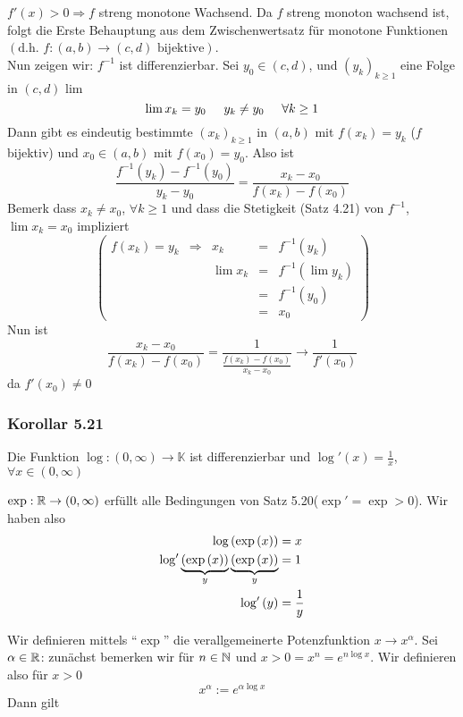 \begin{beweis}{}
$f'(x)>0\Rightarrow f$ streng monotone Wachsend. Da $f$ streng monoton wachsend ist, folgt die Erste Behauptung aus dem Zwischenwertsatz für monotone Funktionen $\left( \text{d.h. }f:\left( a,b\right)\to\left( c,d\right)\text{ bijektive}\right)$.\\

Nun zeigen wir: $f^{-1}$ ist differenzierbar. Sei $y_0\in\left( c,d\right)$, und $\left( y_k\right)_{k\geq 1}$ eine Folge in $\left( c,d\right)$ lim
\[\lim x_k=y_0\hspace{5mm}y_k\not=y_0\hspace{5mm}\forall k\geq 1\] 
Dann gibt es eindeutig bestimmte $\left( x_k\right)_{k\geq 1}$ in $\left( a,b\right)$ mit $f\left( x_k\right)=y_k$ ($f$ bijektiv) und $x_0\in\left( a,b\right)$ mit $f\left( x_0\right)=y_0$. Also ist
\[\frac{{{f^{ - 1}}\left( {{y_k}} \right) - {f^{ - 1}}\left( {{y_0}} \right)}}{{{y_k} - {y_0}}} = \frac{{{x_k} - {x_0}}}{{f\left( {{x_k}} \right) - f\left( {{x_0}} \right)}}\]
Bemerk dass $x_k\not=x_0$, $\forall k\geq 1$ und dass die Stetigkeit (Satz 4.21) von $f^{-1}$, $\lim x_k=x_0$ impliziert
\[\left( {\begin{array}{*{20}{c}}
{f\left( {{x_k}} \right) = {y_k}}& \Rightarrow &{{x_k}}& = &{{f^{ - 1}}\left( {{y_k}} \right)}\\
{}&{}&{\lim {x_k}}& = &{{f^{ - 1}}\left( {\lim {y_k}} \right)}\\
{}&{}&{}& = &{{f^{ - 1}}\left( {{y_0}} \right)}\\
{}&{}&{}& = &{{x_0}}
\end{array}} \right)\]
Nun ist 
\[\frac{{{x_k} - {x_0}}}{{f\left( {{x_k}} \right) - f\left( {{x_0}} \right)}} = \frac{1}{{\frac{{f\left( {{x_k}} \right) - f\left( {{x_0}} \right)}}{{{x_k} - {x_0}}}}} \to \frac{1}{{f'\left( {{x_0}} \right)}}\]
da $f'\left( x_0\right)\not=0$
\end{beweis}

\subsubsection*{Korollar 5.21}
Die Funktion $\log :\left( 0,\infty\right)\to\mathbb{K}$ ist differenzierbar und $\log'(x)=\frac{1}{x}$, $\forall x\in\left( 0,\infty\right)$

\begin{beweis}{}
$\exp : \mathbb{R}\to\left( 0,\infty\right)$ erfüllt alle Bedingungen von Satz 5.20($\exp'=\exp>0$). Wir haben also 
\begin{align*}
\log \left( {\exp \left( x \right)} \right) &= x\\
{\mathop{\rm log'}\nolimits} \underbrace {\left( {\exp \left( x \right)} \right)}_y\underbrace {\left( {\exp \left( x \right)} \right)}_y &= 1\\
{\mathop{\rm log'}\nolimits} \left( y \right) &= \frac{1}{y}
\end{align*}
\end{beweis}
Wir definieren mittels ``$\exp$'' die verallgemeinerte Potenzfunktion $x\to x^\alpha$. Sei $\alpha\in\mathbb{R}$: zunächst bemerken wir für $n\in\mathbb{N}$ und $x>0=x^n=e^{n\log x}$. Wir definieren also für $x>0$ \[x^\alpha := e^{\alpha\log x}\]
Dann gilt
